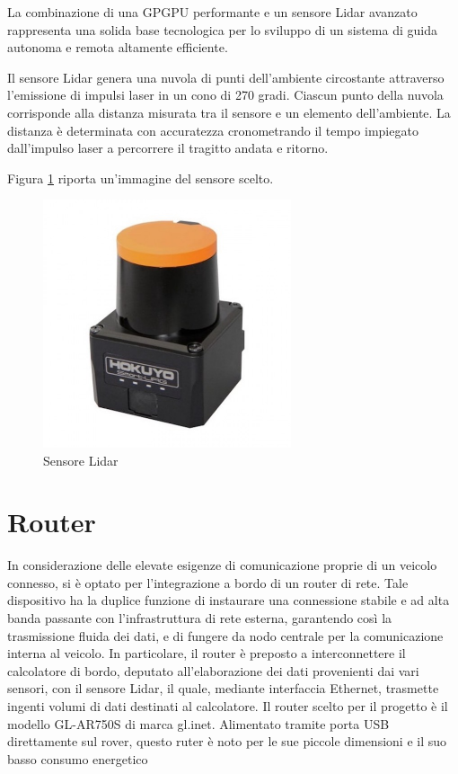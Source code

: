 \noindent La combinazione di una GPGPU performante e un sensore Lidar avanzato rappresenta una solida base tecnologica per lo sviluppo di un sistema di guida autonoma e remota altamente efficiente.

\noindent Il sensore Lidar genera una nuvola di punti dell'ambiente circostante attraverso l'emissione di impulsi laser in un cono di 270 gradi. Ciascun punto della nuvola corrisponde alla distanza misurata tra il sensore e un elemento dell'ambiente. La distanza è determinata con accuratezza cronometrando il tempo impiegato dall'impulso laser a percorrere il tragitto andata e ritorno.

Figura \ref{Sensore Lidar} riporta un'immagine del sensore scelto.

\begin{figure}[h]
  \centering
  \includegraphics[width=0.65\textwidth]{figures/sensore_hokuio.jpg}
  \caption{Sensore Lidar}
  \label{Sensore Lidar}
\end{figure}

\section{Router}
In considerazione delle elevate esigenze di comunicazione proprie di un veicolo connesso, si è optato per l'integrazione a bordo di un router di rete. Tale dispositivo ha la duplice funzione di instaurare una connessione stabile e ad alta banda passante con l'infrastruttura di rete esterna, garantendo così la trasmissione fluida dei dati, e di fungere da nodo centrale per la comunicazione interna al veicolo. In particolare, il router è preposto a interconnettere il calcolatore di bordo, deputato all'elaborazione dei dati provenienti dai vari sensori, con il sensore Lidar, il quale, mediante interfaccia Ethernet, trasmette ingenti volumi di dati destinati al calcolatore. Il router scelto per il progetto è il modello GL-AR750S di marca gl.inet. Alimentato tramite porta USB direttamente sul rover, questo ruter è noto per le sue piccole dimensioni e il suo basso consumo energetico

